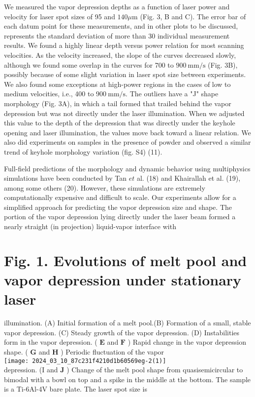 \documentclass[10pt]{article}
\begin{document}
We measured the vapor depression depths as a function of laser power and velocity for laser spot sizes of 95 and $140 \mu \mathrm{m}$ (Fig. 3, B and C). The error bar of each datum point for these measurements, and in other plots to be discussed, represents the standard deviation of more than 30 individual measurement results. We found a highly linear depth versus power relation for most scanning velocities. As the velocity increased, the slope of the curves decreased slowly, although we found some overlap in the curves for 700 to $900 \mathrm{~mm} / \mathrm{s}$ (Fig. 3B), possibly because of some slight variation in laser spot size between experiments. We also found some exceptions at high-power regions in the cases of low to medium velocities, i.e., 400 to $900 \mathrm{~mm} / \mathrm{s}$. The outliers have a "J" shape morphology (Fig. 3A), in which a tail formed that trailed behind the vapor depression but was not directly under the laser illumination. When we adjusted this value to the depth of the depression that was directly under the keyhole opening and laser illumination, the values move back toward a linear relation. We also did experiments on samples in the presence of powder and observed a similar trend of keyhole morphology variation (fig. S4) (11).

Full-field predictions of the morphology and dynamic behavior using multiphysics simulations have been conducted by Tan $e t$ al. (18) and Khairallah et al. (19), among some others (20). However, these simulations are extremely computationally expensive and difficult to scale. Our experiments allow for a simplified approach for predicting the vapor depression size and shape. The portion of the vapor depression lying directly under the laser beam formed a nearly straight (in projection) liquid-vapor interface with

\section*{Fig. 1. Evolutions of melt pool and vapor depression under stationary laser}
 illumination. (A) Initial formation of a melt pool.(B) Formation of a small, stable vapor depression. (C) Steady growth of the vapor depression. (D) Instabilities form in the vapor depression. ( $\mathbf{E}$ and $\mathbf{F}$ ) Rapid change in the vapor depression shape. ( $\mathbf{G}$ and $\mathbf{H}$ ) Periodic fluctuation of the vapor\\
\texttt{[image: 2024\_03\_10\_87c231f4210d1b60569eg-2(1)]}\\
depression. (I and $\mathbf{J}$ ) Change of the melt pool shape from quasisemicircular to bimodal with a bowl on top and a spike in the middle at the bottom. The sample is a Ti-6Al-4V bare plate. The laser spot size is
\end{document}
